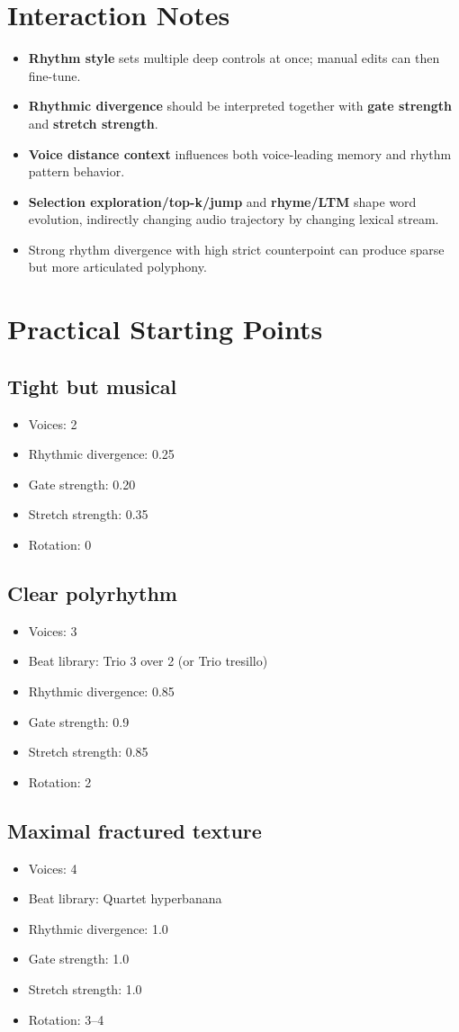\documentclass[11pt,a4paper]{article}
\begin{document}
\section{Interaction Notes}
\begin{itemize}
  \item \textbf{Rhythm style} sets multiple deep controls at once; manual edits can then fine-tune.
  \item \textbf{Rhythmic divergence} should be interpreted together with \textbf{gate strength} and \textbf{stretch strength}.
  \item \textbf{Voice distance context} influences both voice-leading memory and rhythm pattern behavior.
  \item \textbf{Selection exploration/top-k/jump} and \textbf{rhyme/LTM} shape word evolution, indirectly changing audio trajectory by changing lexical stream.
  \item Strong rhythm divergence with high strict counterpoint can produce sparse but more articulated polyphony.
\end{itemize}

\section{Practical Starting Points}
\subsection*{Tight but musical}
\begin{itemize}
  \item Voices: 2
  \item Rhythmic divergence: 0.25
  \item Gate strength: 0.20
  \item Stretch strength: 0.35
  \item Rotation: 0
\end{itemize}

\subsection*{Clear polyrhythm}
\begin{itemize}
  \item Voices: 3
  \item Beat library: Trio 3 over 2 (or Trio tresillo)
  \item Rhythmic divergence: 0.85
  \item Gate strength: 0.9
  \item Stretch strength: 0.85
  \item Rotation: 2
\end{itemize}

\subsection*{Maximal fractured texture}
\begin{itemize}
  \item Voices: 4
  \item Beat library: Quartet hyperbanana
  \item Rhythmic divergence: 1.0
  \item Gate strength: 1.0
  \item Stretch strength: 1.0
  \item Rotation: 3--4
\end{itemize}
\end{document}
